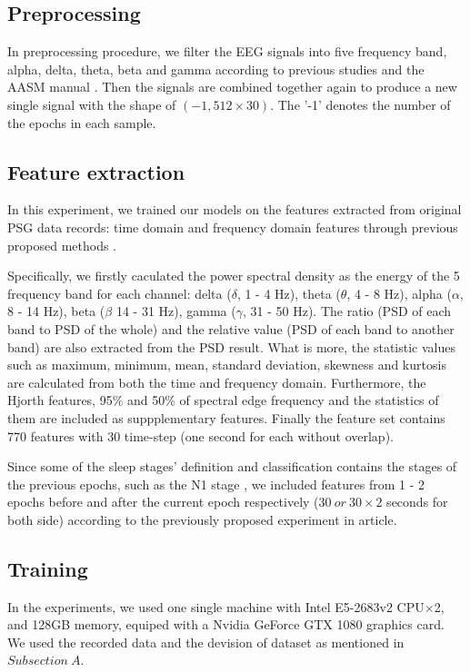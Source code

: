 \documentclass[journal]{IEEEtran}
\begin{document}
\subsection{Preprocessing}
In preprocessing procedure, we filter the EEG signals into five frequency band, alpha, delta, theta, beta and gamma according to previous studies and the AASM manual \cite{ronzhina2012sleep,ebrahimi2008automatic,berry2012aasm}. Then the signals are combined together again to produce a new single signal with the shape of $(-1, 512\times30)$. The '-1' denotes the number of the epochs in each sample.
\subsection{Feature extraction}
In this experiment, we trained our models on the features extracted from original PSG data records: time domain and frequency domain features through previous proposed methods \cite{ronzhina2012sleep,ebrahimi2008automatic,chapotot2010automated}.

Specifically, we firstly caculated the power spectral density as the energy of the 5 frequency band for each channel: delta ($\delta$, 1 - 4 Hz), theta ($\theta$, 4 - 8 Hz), alpha ($\alpha$, 8 - 14 Hz), beta ($\beta$ 14 - 31 Hz), gamma ($\gamma$, 31 - 50 Hz). The ratio (PSD of each band to PSD of the whole) and the relative value (PSD of each band to another band) are also extracted from the PSD result. What is more, the statistic values such as maximum, minimum, mean, standard deviation, skewness and kurtosis are calculated from both the time and frequency domain. Furthermore, the Hjorth features, 95\% and 50\% of spectral edge frequency and the statistics of them are included as suppplementary features. Finally the feature set contains 770 features with 30 time-step (one second for each without overlap).

Since some of the sleep stages' definition and classification contains the stages of the previous epochs, such as the N1 stage \cite{berry2012aasm}, we included features from 1 - 2 epochs before and after the current epoch respectively ($30\ or\ 30\times 2$ seconds for both side) according to the previously proposed experiment in article\cite{chambon2017deep}.
\subsection{Training}
In the experiments, we used one single machine with Intel E5-2683v2 CPU$\times$2, and 128GB memory, equiped with a Nvidia GeForce GTX 1080 graphics card. We used the recorded data and the devision of dataset as mentioned in $Subsection\ A$. 
\end{document}
